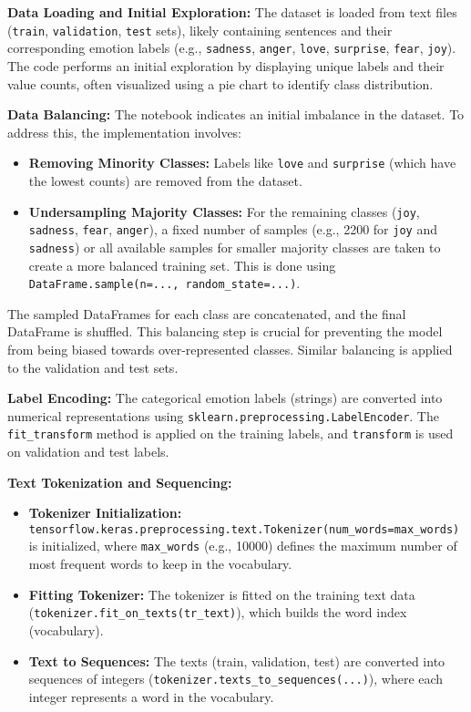 \documentclass[twocolumn]{article}
\begin{document}
\textbf{Data Loading and Initial Exploration:}
The dataset is loaded from text files (\texttt{train}, \texttt{validation}, \texttt{test} sets), likely containing sentences and their corresponding emotion labels (e.g., \texttt{sadness}, \texttt{anger}, \texttt{love}, \texttt{surprise}, \texttt{fear}, \texttt{joy}). The code performs an initial exploration by displaying unique labels and their value counts, often visualized using a pie chart to identify class distribution.

\vspace{0.5em}
\textbf{Data Balancing:}
The notebook indicates an initial imbalance in the dataset. To address this, the implementation involves:
\begin{itemize}
    \item \textbf{Removing Minority Classes:} Labels like \texttt{love} and \texttt{surprise} (which have the lowest counts) are removed from the dataset.
    \item \textbf{Undersampling Majority Classes:} For the remaining classes (\texttt{joy}, \texttt{sadness}, \texttt{fear}, \texttt{anger}), a fixed number of samples (e.g., 2200 for \texttt{joy} and \texttt{sadness}) or all available samples for smaller majority classes are taken to create a more balanced training set. This is done using \texttt{DataFrame.sample(n=..., random\_state=...)}.
\end{itemize}
The sampled DataFrames for each class are concatenated, and the final DataFrame is shuffled. This balancing step is crucial for preventing the model from being biased towards over-represented classes. Similar balancing is applied to the validation and test sets.

\vspace{0.5em}
\textbf{Label Encoding:} 
The categorical emotion labels (strings) are converted into numerical representations using \texttt{sklearn.preprocessing.LabelEncoder}. The \texttt{fit\_transform} method is applied on the training labels, and \texttt{transform} is used on validation and test labels.

\vspace{0.5em}
\textbf{Text Tokenization and Sequencing:}
\begin{itemize}
    \item \textbf{Tokenizer Initialization:} \texttt{tensorflow.keras.preprocessing.text.Tokenizer(num\_words=max\_words)} is initialized, where \texttt{max\_words} (e.g., 10000) defines the maximum number of most frequent words to keep in the vocabulary.
    \item \textbf{Fitting Tokenizer:} The tokenizer is fitted on the training text data (\texttt{tokenizer.fit\_on\_texts(tr\_text)}), which builds the word index (vocabulary).
    \item \textbf{Text to Sequences:} The texts (train, validation, test) are converted into sequences of integers (\texttt{tokenizer.texts\_to\_sequences(...)}), where each integer represents a word in the vocabulary.
\end{itemize}
\end{document}
